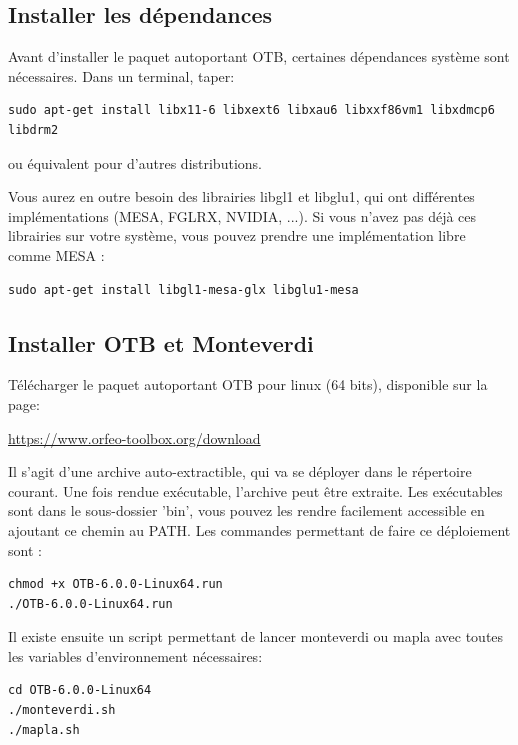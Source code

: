 \documentclass[10pt,a4paper]{article}
\begin{document}
\subsection{Installer les dépendances}
Avant d'installer le paquet autoportant OTB, certaines dépendances système
sont nécessaires. Dans un terminal, taper:
\begin{verbatim}
sudo apt-get install libx11-6 libxext6 libxau6 libxxf86vm1 libxdmcp6 libdrm2
\end{verbatim}
ou équivalent pour d'autres distributions.

Vous aurez en outre besoin des librairies libgl1 et libglu1, qui ont
différentes implémentations (MESA, FGLRX, NVIDIA, ...). Si vous n'avez pas
déjà ces librairies sur votre système, vous pouvez prendre une implémentation
libre comme MESA :
\begin{verbatim}
sudo apt-get install libgl1-mesa-glx libglu1-mesa
\end{verbatim}

\subsection{Installer OTB et Monteverdi}
Télécharger le paquet autoportant OTB pour linux (64 bits), disponible sur la
page:
\begin{center}
\url{https://www.orfeo-toolbox.org/download}
\end{center}

Il s'agit d'une archive auto-extractible, qui va se déployer dans le répertoire
courant. Une fois rendue exécutable, l'archive peut être extraite. Les
exécutables sont dans le sous-dossier 'bin', vous pouvez les rendre facilement
accessible en ajoutant ce chemin au PATH. Les commandes permettant de faire
ce déploiement sont :
\begin{verbatim}
chmod +x OTB-6.0.0-Linux64.run
./OTB-6.0.0-Linux64.run
\end{verbatim}

Il existe ensuite un script permettant de lancer monteverdi ou mapla avec toutes les
variables d'environnement nécessaires:
\begin{verbatim}
cd OTB-6.0.0-Linux64
./monteverdi.sh
./mapla.sh
\end{verbatim}
\end{document}
